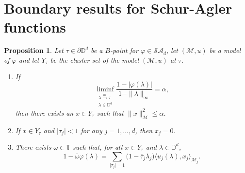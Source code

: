 \documentclass[11pt, reqno]{amsart}
\newtheorem{proposition}[theorem]{Proposition}
\newcommand\1{\boldsymbol {1}}
\numberwithin{equation}{section}
\begin{document}
\section{Boundary results for Schur-Agler functions}\label{boundary-results}
\begin{proposition}\label{prop4.2generalized}
Let $\tau\in\partial\mathbb{D}^{d}$ be a $B$-point for $\varphi\in\mathcal{SA}_{d}$, let $(\mathcal{M},u)$ be a model of $\varphi$ and let $Y_{\tau}$ be the cluster set of the  model $(\mathcal{M},u)$ at $\tau$.
\begin{enumerate}
\item If
   $$\liminf_{\substack {\lambda{\overset{nt}\rightarrow}\tau \\ \lambda \in \mathbb{D}^{d}}} \dfrac{1-\lvert \varphi(\lambda) \rvert}{1-\|\lambda\|_{\infty}}=\alpha,$$
then there exists an $x\in Y_{\tau}$ such that $\| x\|^{2}_{\mathcal{M}}\leq \alpha$.
\item If $x\in Y_{\tau}$ and $\lvert\tau_{j}\rvert< 1$ for any $j=1,\hdots,d$, then $x_{j}=0$.
\item There exists $\omega\in\mathbb{T}$ such that, for all $x\in Y_{\tau}$ and $\lambda\in\mathbb{D}^{d}$,
    \begin{equation}\label{omegaequationintheoremstatement}
   1-\overline{\omega}\varphi(\lambda)=\sum_{\lvert \tau_{j} \rvert = 1}\Big(1-\overline{\tau}_{j}\lambda_{j}\Big)\langle u_{j}(\lambda),x_{j}\rangle_{\mathcal{M}_{j}}.
    \end{equation}
\end{enumerate} 
\end{proposition}
\end{document}

